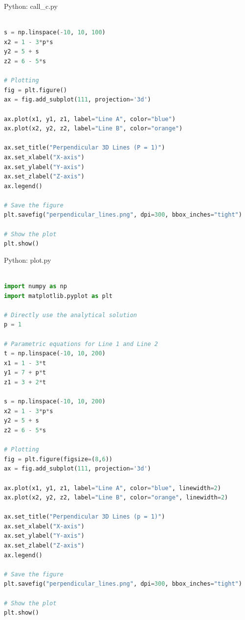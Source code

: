 \documentclass{beamer}
\numberwithin{equation}{section}
\theoremstyle{remark}
\begin{document}
\begin{frame}[fragile]{Python: call\_c.py}
\begin{lstlisting}[language=Python]

s = np.linspace(-10, 10, 100)
x2 = 1 - 3*p*s
y2 = 5 + s
z2 = 6 - 5*s

# Plotting
fig = plt.figure()
ax = fig.add_subplot(111, projection='3d')

ax.plot(x1, y1, z1, label="Line A", color="blue")
ax.plot(x2, y2, z2, label="Line B", color="orange")

ax.set_title("Perpendicular 3D Lines (P = 1)")
ax.set_xlabel("X-axis")
ax.set_ylabel("Y-axis")
ax.set_zlabel("Z-axis")
ax.legend()

# Save the figure
plt.savefig("perpendicular_lines.png", dpi=300, bbox_inches="tight")

# Show the plot
plt.show()

\end{lstlisting}
\end{frame}

\begin{frame}[fragile]{Python: plot.py}
\begin{lstlisting}[language=Python]

import numpy as np
import matplotlib.pyplot as plt

# Directly use the analytical solution
p = 1

# Parametric equations for Line 1 and Line 2
t = np.linspace(-10, 10, 200)
x1 = 1 - 3*t
y1 = 7 + p*t
z1 = 3 + 2*t

s = np.linspace(-10, 10, 200)
x2 = 1 - 3*p*s
y2 = 5 + s
z2 = 6 - 5*s

# Plotting
fig = plt.figure(figsize=(8,6))
ax = fig.add_subplot(111, projection='3d')

ax.plot(x1, y1, z1, label="Line A", color="blue", linewidth=2)
ax.plot(x2, y2, z2, label="Line B", color="orange", linewidth=2)

ax.set_title("Perpendicular 3D Lines (p = 1)")
ax.set_xlabel("X-axis")
ax.set_ylabel("Y-axis")
ax.set_zlabel("Z-axis")
ax.legend()

# Save the figure
plt.savefig("perpendicular_lines.png", dpi=300, bbox_inches="tight")

# Show the plot
plt.show()

\end{lstlisting}
\end{frame}
\end{document}

